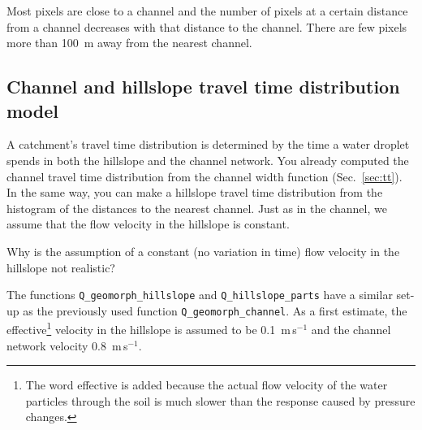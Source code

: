 \documentclass[twocolumn, 10pt, a4paper]{article}
\newenvironment{PC_prac_environment}{
\def\Q{\noindent \color{Gray}\rule[-0.1cm]{\columnwidth}{1.5pt}  \color{black} } \let\ques\Q 
\def\nQ{\noindent \color{black} } \let\ques\nQ 
\def\E{\color{Gray}\rule[0.3cm]{\columnwidth}{1.5pt} \color{black}} \let\ques\E }
\newcommand{\A}[2] { \ifthenelse{\boolean{showanswer}} {\noindent \color{cyan}{#2}\color{black}} {\multido{}{#1}{\noindent \color{light-gray}\hrulefill\\} } }
\begin{document}
\begin{PC_prac_environment}
{Most pixels are close to a channel and the number of pixels at a certain distance from a channel decreases with that distance to the channel. There are few pixels more than 100~m away from the nearest channel.\\}
\E

\subsection{Channel and hillslope travel time distribution model}
A catchment's travel time distribution is determined by the time a water droplet spends in both the hillslope and the channel network. You already computed the channel travel time distribution from the channel width function (Sec.~\ref{sec:tt}). In the same way, you can make a hillslope travel time distribution from the histogram of the distances to the nearest channel. Just as in the channel, we assume that the flow velocity in the hillslope is constant.

\Q Why is the assumption of a constant (no variation in time) flow velocity in the hillslope not realistic?\\
\E

The functions \verb!Q_geomorph_hillslope! and \verb!Q_hillslope_parts! have a similar set-up as the previously used function \verb!Q_geomorph_channel!. As a first estimate, the effective\footnote{The word effective is added because the actual flow velocity of the water particles through the soil is much slower than the response caused by pressure changes.} velocity in the hillslope is assumed to be 0.1~m\,s$^{-1}$ and the channel network velocity 0.8~m\,s$^{-1}$.


\end{PC_prac_environment}
\end{document}
